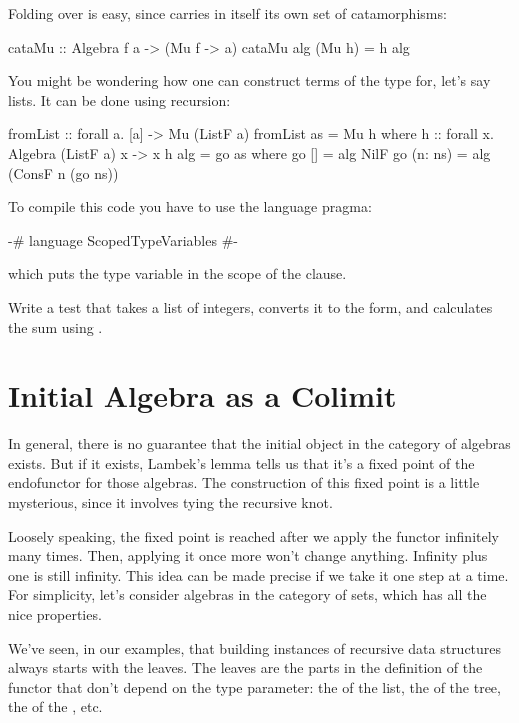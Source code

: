 \documentclass[DaoFP]{subfiles}
\begin{document}
Folding over  is easy, since  carries in itself its own set of catamorphisms:
\begin{haskell}
cataMu :: Algebra f a -> (Mu f -> a)
cataMu alg (Mu h) = h alg
\end{haskell}

You might be wondering how one can construct terms of the type  for, let's say lists. It can be done using recursion:
\begin{haskell}
fromList :: forall a. [a] -> Mu (ListF a)
fromList as = Mu h
  where h :: forall x. Algebra (ListF a) x -> x
        h alg = go as
          where
            go [] = alg NilF
            go (n: ns) = alg (ConsF n (go ns))
\end{haskell}
To compile this code you have to use the language pragma:
\begin{haskell}
{-# language ScopedTypeVariables #-}
\end{haskell}
which puts the type variable  in the scope of the  clause.

\begin{exercise}
Write a test that takes a list of integers, converts it to the  form, and calculates the sum using .
\end{exercise}


\section{Initial Algebra as a Colimit}

In general, there is no guarantee that the initial object in the category of algebras exists. But if it exists, Lambek's lemma tells us that it's a fixed point of the endofunctor for those algebras.  The construction of this fixed point is a little mysterious, since it involves tying the recursive knot. 

Loosely speaking, the fixed point is reached after we apply the functor infinitely many times. Then, applying it once more won't change anything. Infinity plus one is still infinity. This idea can be made precise if we take it one step at a time. For simplicity, let's consider algebras in the category of sets, which has all the nice properties.

We've seen, in our examples, that building instances of recursive data structures always starts with the leaves. The leaves are the parts in the definition of the functor that don't depend on the type parameter: the  of the list, the  of the tree, the  of the , etc. 
\end{document}
